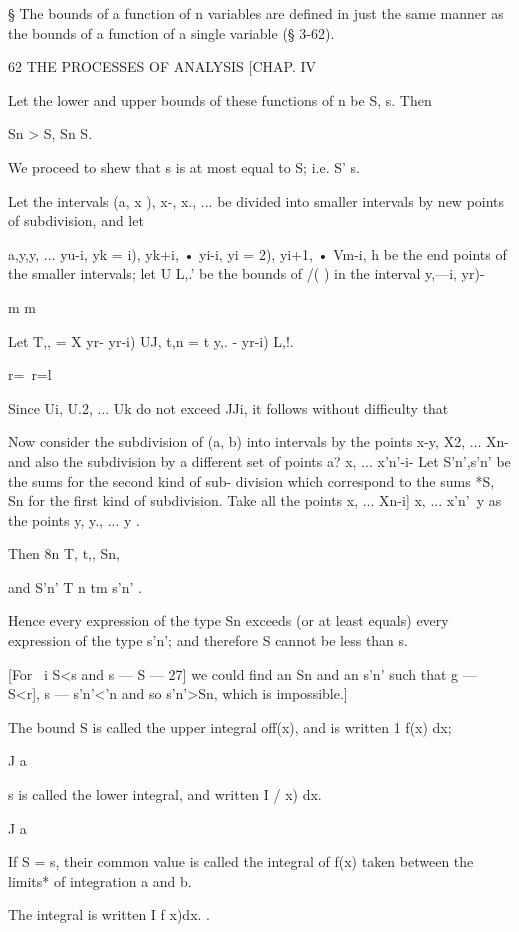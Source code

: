 § The bounds of a function of n variables are defined in just the same
manner as the bounds of a function of a single variable (§ 3-62).



62 THE PROCESSES OF ANALYSIS [CHAP. IV

Let the lower and upper bounds of these functions of n be S, s. Then

Sn > S, Sn S.

We proceed to shew that s is at most equal to S; i.e. S' s.

Let the intervals (a, x ), x-, x., ... be divided into smaller
intervals by new points of subdivision, and let

a,y,y, ... yu-i, yk = i), yk+i, • yi-i, yi = 2), yi+1, • Vm-i, h be
the end points of the smaller intervals; let U L,.' be the bounds of
/( ) in the interval y,—i, yr)-

m m

Let T,, = X yr- yr-i) UJ, t,n = t y,. - yr-i) L,!.

r=\ r=l

Since Ui, U.2, ... Uk do not exceed JJi, it follows without difficulty
that

Now consider the subdivision of (a, b) into intervals by the points
x-y, X2, ... Xn-\, and also the subdivision by a different set of
points a? x, ... x'n'-i- Let S'n',s'n' be the sums for the second
kind of sub- division which correspond to the sums *S, Sn for the
first kind of subdivision. Take all the points x, ... Xn-i] x, ...
x'n'\ y as the points y, y., ... y .

Then 8n T, t,, Sn,

and S'n' T n tm s'n' .

Hence every expression of the type Sn exceeds (or at least equals)
every expression of the type s'n'; and therefore S cannot be less
than s.

[For \ i S<s and s — S — 27] we could find an Sn and an s'n' such that
g — S<r], s — s'n'<'n and so s'n'>Sn, which is impossible.]

The bound S is called the upper integral off(x), and is written 1 f(x)
dx;

J a

s is called the lower integral, and written I / x) dx.

J a

If S = s, their common value is called the integral of f(x) taken
between the limits* of integration a and b.

The integral is written I f x)dx. .

